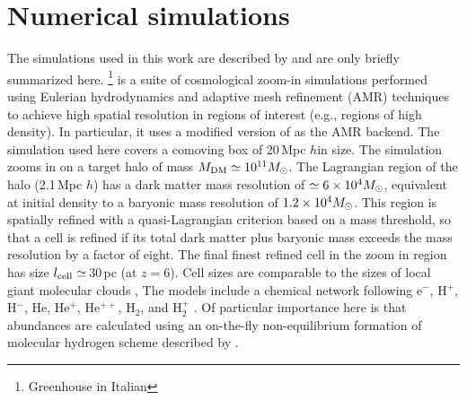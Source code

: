 \IfFileExists{emulateapjlegacy.cls}{\documentclass[iop]{emulateapjlegacy}}{\documentclass[iop]{emulateapj}}
\newcommand{\AP}[1]{({\bf \color{apcolor} AP: #1})}
\newcommand{\MM}[1]{({\bf \color{mmcolor} MM: #1})}
\begin{document}
\section{Numerical simulations}\label{sec:sim}
The simulations used in this work are described by \citealt{Pallottini17a, Pallottini17b} and are only briefly summarized here.
%
\footnote{Greenhouse in Italian} is a suite of cosmological zoom-in simulations performed using Eulerian hydrodynamics and adaptive mesh refinement (AMR) techniques to achieve high spatial resolution in regions of interest (e.g., regions of high density).
%
In particular, it uses a modified version of 
\citep{Teyssier02a} as the AMR backend. The simulation used here
covers a comoving box of 20\,Mpc $h$\pmOne in size. The simulation
zooms in on a target halo of mass $M_{\rm DM}\simeq10^{11} \mbox{$M_{\odot}$}$. The Lagrangian
region of the halo (2.1\,Mpc $h$\pmOne) has a dark matter
mass resolution of $\simeq 6\times 10^4 \mbox{$M_{\odot}$}$, 
     equivalent at initial density to a baryonic mass resolution of $1.2
     \times 10^4 \mbox{$M_{\odot}$}$.  This 
region is spatially refined with a quasi-Lagrangian criterion based on
a mass threshold, so that a cell is refined if its total dark matter
plus baryonic mass exceeds the mass resolution by a factor of
eight. The final finest refined cell in the zoom in region has size
$l_{\rm cell}\simeq$\,30\,pc (at $z = 6$). 
     Cell sizes are comparable to the sizes of local giant molecular clouds \citep[e.g.,][]{Sanders85a, Federrath13a, Goodman14a},
The models include a chemical network 
following e$^{-}$, H$^+$, H$^-$, He, He$^+$, He$^{++}$, H$_2$, and
H$_2^+$ \citep{Grassi14a,Bovino16a}. Of particular importance here is
that abundances are calculated using an on-the-fly non-equilibrium
formation of molecular hydrogen scheme  
    described by \citet{Pallottini17a}.
\end{document}
